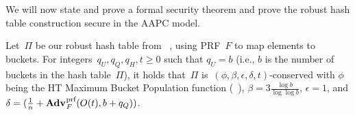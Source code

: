 We will now state and prove a formal security theorem and prove the robust hash table construction secure in the AAPC model.

\begin{theorem}\label{thm:rhtsr2}
    Let~$\Pi$ be our robust hash table from ~, using PRF~$F$ to map elements to buckets. For integers~$q_U,q_Q,q_H,t \geq 0$ such that $q_U = b$ (i.e., $b$ is the number of buckets in the hash table~$\Pi$), it holds that~$\Pi$ is~$(\phi,\beta,\epsilon,\delta,t)$-conserved with $\phi$ being the HT Maximum Bucket Population function (~), $\beta = 3 \frac{\log b}{\log \log b}$, $\epsilon = 1$, and $\delta = (\frac{1}{n} + \Adv{\text{prf}}_{F}(O(t),b+q_Q))$.
\end{theorem}


